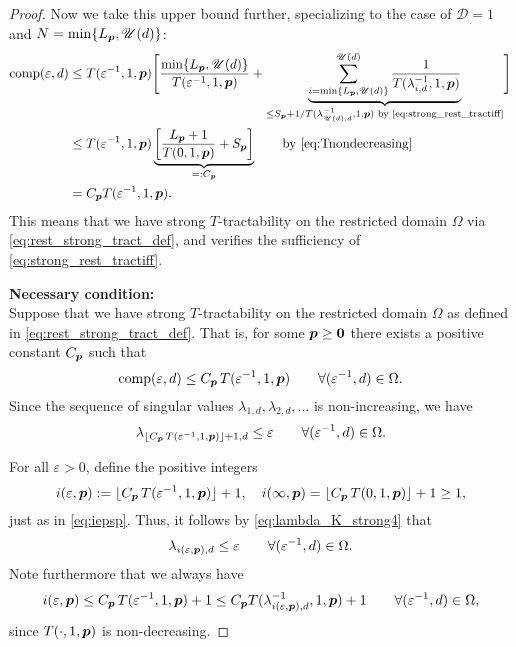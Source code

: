 \documentclass[sort&compress]{elsarticle}
\newcommand{\thed}{\mathscr{D}}
\newcommand{\theUB}{\mathscr{U}}
\begin{document}
\begin{proof}
Now we take this upper bound further, specializing to the case of $\thed=1$ and $N = \min\{L_{\vp},\theUB(d)\}$:
\begin{align*}
       \comp(\varepsilon,d)
       & \le T(\varepsilon^{-1},1, \vp) \Biggl [ \frac{\min\{L_{\vp},\theUB(d)\}}{T(\varepsilon^{-1},1, \vp)}  + \underbrace{\sum_{i = \min\{L_{\vp},\theUB(d)\}}^{\theUB(d)} \frac{1}{T(\lambda_{i, d}^{-1},1,\vp)}}_{\le S_{\vp} + 1/ T(\lambda_{\theUB(d), d}^{-1},1,\vp) \text{ by \eqref{eq:strong_rest_tractiff}} }
        \Biggr] \\
       & \le T(\varepsilon^{-1},1,\vp) \underbrace{\left[\frac{L_{\vp}+1}{T(0,1, \vp)} + S_{\vp} \right]}_{=:C_{\vp}}
       \qquad \text{by \eqref{eq:Tnondecreasing}}\\
       & =  C_{\vp}T(\varepsilon^{-1},1,\vp).
\end{align*}
This means that we have strong $T$-tractability on the restricted domain $\Omega$ via \eqref{eq:rest_strong_tract_def}, and verifies the sufficiency of \eqref{eq:strong_rest_tractiff}.



\bigskip
\noindent \textbf{Necessary condition:} \\
Suppose that we have strong
$T$-tractability on the restricted domain $\Omega$ as defined in \eqref{eq:rest_strong_tract_def}. That is, for some $\boldsymbol{p} \ge \boldsymbol{0}$ there exists a positive constant $C_{\boldsymbol{p}}$ such that
\[
\operatorname{comp}(\varepsilon,d)\le C_{\boldsymbol{p}}\, T(\varepsilon^{-1},1,\boldsymbol{p})
\qquad \forall (\varepsilon^{-1}, d) \in \Omega.
\]
Since the sequence of singular values $\lambda_{1,d}, \lambda_{2,d}, \ldots $ is non-increasing, we have
\begin{equation}\label{eq:lambda_K_strong4}
\lambda_{\lfloor C_{\boldsymbol{p}}\, T(\varepsilon^{-1},1,\boldsymbol{p})\rfloor +1,d}\le \varepsilon \qquad\forall (\varepsilon^{-1}, d) \in \Omega.
\end{equation}

For  all $\varepsilon > 0$, define the positive integers
\[
i(\varepsilon,\boldsymbol{p}):= \lfloor C_{\boldsymbol{p}}\, T(\varepsilon^{-1},1,\boldsymbol{p})\rfloor +1, \quad
i(\infty,\boldsymbol{p}) =  \lfloor C_{\boldsymbol{p}}\, T(0,1,\boldsymbol{p})\rfloor +1 \ge 1,
\]
just as in \eqref{eq:iepsp}.
Thus, it follows by \eqref{eq:lambda_K_strong4} that
\begin{equation} \label{eq:lambdaiep}
\lambda_{i(\varepsilon,\boldsymbol{p}),d} \le \varepsilon \qquad
 \forall (\varepsilon^{-1}, d) \in \Omega.
\end{equation}
Note furthermore that we always have
\[
i(\varepsilon,\boldsymbol{p})\le C_{\boldsymbol{p}}\, T(\varepsilon^{-1},1,\boldsymbol{p})+1 \le C_{\boldsymbol{p}} T(\lambda_{i(\varepsilon,\boldsymbol{p}),d}^{-1},1,\boldsymbol{p})+1 \qquad  \forall (\varepsilon^{-1}, d)\in \Omega,
\]
since
$T(\cdot,1, \boldsymbol{p})$ is non-decreasing.


\end{proof}
\end{document}
